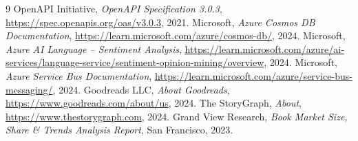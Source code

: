 \documentclass[12pt, a4paper]{report}
\begin{document}
\begin{thebibliography}{9}
    OpenAPI Initiative, \textit{OpenAPI Specification 3.0.3},
    \url{https://spec.openapis.org/oas/v3.0.3}, 2021.
    Microsoft, \textit{Azure Cosmos DB Documentation},
    \url{https://learn.microsoft.com/azure/cosmos-db/}, 2024.
    Microsoft, \textit{Azure AI Language – Sentiment Analysis},
    \url{https://learn.microsoft.com/azure/ai-services/language-service/sentiment-opinion-mining/overview}, 2024.
    Microsoft, \textit{Azure Service Bus Documentation},
    \url{https://learn.microsoft.com/azure/service-bus-messaging/}, 2024.
    Goodreads LLC, \textit{About Goodreads},
    \url{https://www.goodreads.com/about/us}, 2024.
    The StoryGraph, \textit{About},
    \url{https://www.thestorygraph.com}, 2024.
    Grand View Research, \textit{Book Market Size, Share \& Trends Analysis Report},
    San Francisco, 2023.
\end{thebibliography}
\end{document}
